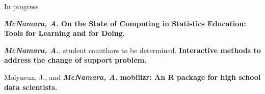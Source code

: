 \documentclass{resume} %
\begin{document}

\begin{rSection}{In progress}

{\bf \em{McNamara, A.}} {\bf On the State of Computing in Statistics Education: Tools for Learning and for Doing. } 

{\bf \em{McNamara, A.}}, student coauthors to be determined. {\bf Interactive methods to address the change of support problem. } 

Molyneux, J., and {\bf \em McNamara, A.} {\bf mobilizr: An R package for high school data scientists.}

\end{rSection}


\end{document}

